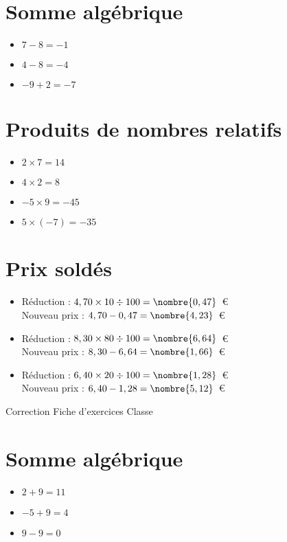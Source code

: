 \documentclass[a4paper,11pt,fleqn]{article}		%
\begin{document}
\section{Somme algébrique}
\begin{itemize}

  \item $7 -8=-1$
  \item $4 -8=-4$
  \item $-9 +2=-7$
\end{itemize}

\section{Produits de nombres relatifs}
\begin{itemize}

  \item $2\times7=14$
  \item $4\times2=8$
  \item $-5\times9=-45$
  \item $5\times(-7)=-35$
\end{itemize}

\section{Prix soldés}
\begin{itemize}

  \item Réduction : $4,70\times10\div100=\nombre{0,47}$~€\\
  Nouveau prix : $4,70-0,47=\nombre{4,23}$~€
  \item Réduction : $8,30\times80\div100=\nombre{6,64}$~€\\
  Nouveau prix : $8,30-6,64=\nombre{1,66}$~€
  \item Réduction : $6,40\times20\div100=\nombre{1,28}$~€\\
  Nouveau prix : $6,40-1,28=\nombre{5,12}$~€
\end{itemize}
\newpage
\setcounter{exo}{0}
\setcounter{section}{0}
{Correction} \hfill {\huge Fiche d'exercices } \hfill {Classe}

\section{Somme algébrique}
\begin{itemize}

  \item $2 +9=11$
  \item $-5 +9=4$
  \item $9 -9=0$
\end{itemize}
\end{document}
